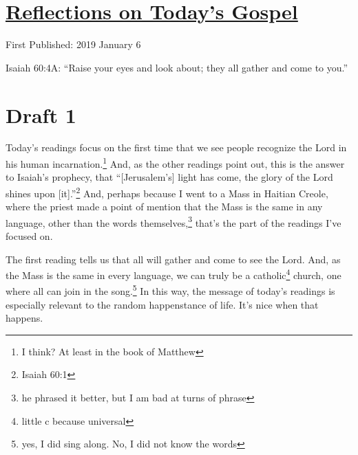 \documentclass[12pt]{article}[titlepage]
\newcommand{\say}[1]{``#1''}
\newcommand{\1}{\={a}}
\newcommand{\2}{\={e}}
\newcommand{\3}{\={\i}}
\newcommand{\4}{\=o}
\newcommand{\5}{\=u}
\newcommand{\6}{\={A}}
\renewcommand{\,}{\textsuperscript{,}}
\begin{document}
\doublespacing
\section{\href{reflections-on-readings-epiphany-c.html}{Reflections on Today's Gospel}}
First Published: 2019 January 6

Isaiah 60:4A: \say{Raise your eyes and look about; they all gather and come to you.}

\section{Draft 1}
Today's readings focus on the first time that we see people recognize the Lord in his human incarnation.\footnote{I think? At least in the book of Matthew}
And, as the other readings point out, this is the answer to Isaiah's prophecy, that \say{[Jerusalem's] light has come, the glory of the Lord shines upon [it].}\footnote{Isaiah 60:1}
And, perhaps because I went to a Mass in Haitian Creole, where the priest made a point of mention that the Mass is the same in any language, other than the words themselves,\footnote{he phrased it better, but I am bad at turns of phrase} that's the part of the readings I've focused on.

The first reading tells us that all will gather and come to see the Lord.
And, as the Mass is the same in every language, we can truly be a catholic\footnote{little c because universal} church, one where all can join in the song.\footnote{yes, I did sing along. No, I did not know the words}
In this way, the message of today's readings is especially relevant to the random happenstance of life.
It's nice when that happens.
\end{document}

